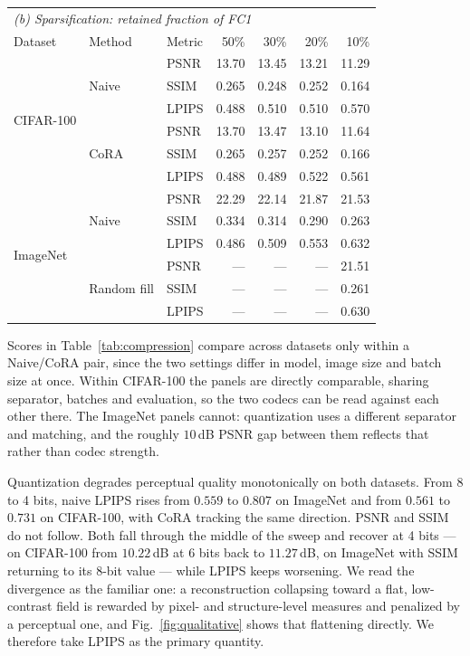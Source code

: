 \documentclass{article}
\newcommand{\cora}{CoRA}
\begin{document}
\begin{table}[!t]
\par\smallskip

\begin{tabular*}{\columnwidth}{@{\extracolsep{\fill}}lllrrrr@{}}
\toprule
\multicolumn{7}{l}{\textit{(b) Sparsification: retained fraction of FC1}}\\
Dataset & Method & Metric & 50\% & 30\% & 20\% & 10\%\\
\midrule
\multirow{6}{*}{CIFAR-100} & \multirow{3}{*}{Naive} & PSNR & 13.70 & 13.45 & 13.21 & 11.29\\
 &  & SSIM & 0.265 & 0.248 & 0.252 & 0.164\\
 &  & LPIPS & 0.488 & 0.510 & 0.510 & 0.570\\
 & \multirow{3}{*}{\cora{}} & PSNR & 13.70 & 13.47 & 13.10 & 11.64\\
 &  & SSIM & 0.265 & 0.257 & 0.252 & 0.166\\
 &  & LPIPS & 0.488 & 0.489 & 0.522 & 0.561\\
\midrule
\multirow{6}{*}{ImageNet} & \multirow{3}{*}{Naive} & PSNR & 22.29 & 22.14 & 21.87 & 21.53\\
 &  & SSIM & 0.334 & 0.314 & 0.290 & 0.263\\
 &  & LPIPS & 0.486 & 0.509 & 0.553 & 0.632\\
 & \multirow{3}{*}{Random fill} & PSNR & --- & --- & --- & 21.51\\
 &  & SSIM & --- & --- & --- & 0.261\\
 &  & LPIPS & --- & --- & --- & 0.630\\
\bottomrule
\end{tabular*}
\end{table}

Scores in Table~\ref{tab:compression} compare across datasets only within a
Naive/\cora{} pair, since the two settings differ in model, image size and
batch size at once. Within CIFAR-100 the panels are directly comparable,
sharing separator, batches and evaluation, so the two codecs can be read
against each other there. The ImageNet panels cannot: quantization uses a
different separator and matching, and the roughly $10$\,dB PSNR gap between
them reflects that rather than codec strength.

Quantization degrades perceptual quality monotonically on both datasets. From
8 to 4 bits, naive LPIPS rises from $0.559$ to $0.807$ on ImageNet and from
$0.561$ to $0.731$ on CIFAR-100, with \cora{} tracking the same direction.
PSNR and SSIM do not follow. Both fall through the middle of the sweep and
recover at 4 bits --- on CIFAR-100 from $10.22$\,dB at 6 bits back to
$11.27$\,dB, on ImageNet with SSIM returning to its 8-bit value --- while
LPIPS keeps worsening. We read the divergence as the familiar one: a
reconstruction collapsing toward a flat, low-contrast field is rewarded by
pixel- and structure-level measures and penalized by a perceptual one, and
Fig.~\ref{fig:qualitative} shows that flattening directly. We therefore take
LPIPS as the primary quantity.
\end{document}
